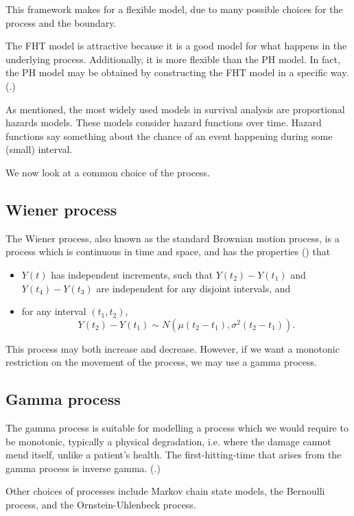 This framework makes for a flexible model, due to many possible choices for the process and the boundary.

The FHT model is attractive because it is a good model for what happens in the underlying process. Additionally, it is more flexible than the PH model. In fact, the PH model may be obtained by constructing the FHT model in a specific way. (\cite{lee2010}.)

As mentioned, the most widely used models in survival analysis are proportional hazards models. These models consider hazard functions over time. Hazard functions say something about the chance of an event happening during some (small) interval.

We now look at a common choice of the process.

\subsection{Wiener process}\label{sec:wiener}
The Wiener process, also known as the standard Brownian motion process, is a process which is continuous in time and space, and has the properties (\cite[61]{caroni2017}) that
\begin{itemize}
    \item $Y(t)$ has independent increments, such that $Y(t_2)-Y(t_1)$ and $Y(t_4)-Y(t_3)$ are independent for any disjoint intervals, and
    \item for any interval $(t_1, t_2)$,
    \[
        Y(t_2)-Y(t_1)\sim N(\mu(t_2-t_1), \sigma^2(t_2-t_1)).
    \]
\end{itemize}
This process may both increase and decrease. However, if we want a monotonic restriction on the movement of the process, we may use a gamma process.

\subsection{Gamma process}
The gamma process is suitable for modelling a process which we would require to be monotonic, typically a physical degradation, i.e. where the damage cannot mend itself, unlike a patient's health. The first-hitting-time that arises from the gamma process is inverse gamma. (\cite[503]{lee2006}.)

Other choices of processes include Markov chain state models, the Bernoulli process, and the Ornstein-Uhlenbeck process.

